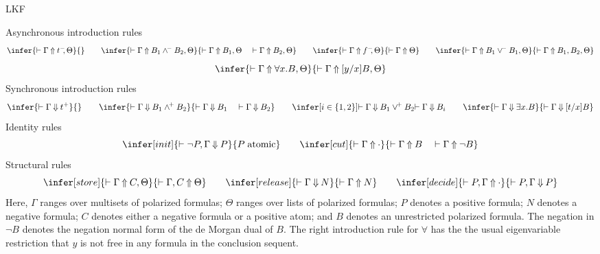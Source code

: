 \calculusAcronym{\LKF}




\maketitle

\begin{entry}{LKF}  

\newcommand{\true}{\hbox{\sl t}}
\newcommand{\false}{\hbox{\sl f}}
\newcommand{\truen}{t^-}
\newcommand{\truep}{t^+}
\newcommand{\falsen}{f^-}
\newcommand{\falsep}{f^+}
\newcommand{\wedgep}{\wedge^{\!+}}
\newcommand{\wedgen}{\wedge^{\!-}}
\newcommand{\veep}{\vee^{\!+}}
\newcommand{\veen}{\vee^{\!-}}

\newcommand{\async}[2]{\vdash#1\mathbin{\Uparrow}   #2}
\newcommand{\sync }[2]{\vdash#1\mathbin{\Downarrow} #2}

\begin{calculus}
{\sc Asynchronous introduction rules}
\[
\infer{\async{\Gamma}{\truen\kern-3pt,\Theta}}{}
\qquad
\infer{\async{\Gamma}{B_1\wedgen B_2,\Theta}}
      {\async{\Gamma}{B_1,\Theta}\quad \async{\Gamma}{B_2,\Theta}}
\qquad
\infer{\async{\Gamma}{\falsen\kern-3pt,\Theta}}{\async{\Gamma}{\Theta}}
\qquad
\infer{\async{\Gamma}{B_1\veen B_1,\Theta}}{\async{\Gamma}{B_1,B_2,\Theta}}
\]
\[
\infer{\async{\Gamma}{\forall x.B,\Theta}}{\async{\Gamma}{[y/x]B,\Theta}}
\]
{\sc Synchronous introduction rules}
\[
\infer{\sync{\Gamma}{\truep}}{}
\qquad
\infer{\sync{\Gamma}{B_1\wedgep B_2}}
      {\sync{\Gamma}{B_1}\quad\sync{\Gamma}{B_2}}
\qquad
\infer[i \in \{1,2\}]{\sync{\Gamma}{B_1\veep B_2}}{\sync{\Gamma}{B_i}}
\qquad
\infer{\sync{\Gamma}{\exists x.B}}{\sync{\Gamma}{[t/x]B}}
\]
{\sc Identity rules}
\[
\infer[init]{\sync{\neg P,\Gamma}{P}}{P \; \mbox{atomic}}
\qquad
\infer[cut]{\async{\Gamma}{\cdot}}{\async{\Gamma}{B}\quad \async{\Gamma}{\neg{B}}}
\]
{\sc Structural rules}
\[
\infer[store]{\async{\Gamma}{C,\Theta}}{\async{\Gamma,C}{\Theta}}
\qquad
\infer[release]{\sync{\Gamma}{N}}{\async{\Gamma}{N}}
\qquad
\infer[decide]{\async{P,\Gamma}{\cdot}}{\sync{P,\Gamma}{P}}
\]
Here,
$\Gamma$ ranges over multisets of polarized formulas;
$\Theta$ ranges over lists of polarized formulas;
$P$ denotes a positive formula;
$N$ denotes a negative formula;
$C$ denotes either a negative formula or a positive atom; and
$B$ denotes an unrestricted polarized formula.
The negation in $\neg B$ denotes the negation normal form of the de
Morgan dual of $B$.
The right introduction rule for $\forall$ has the the usual
eigenvariable restriction that $y$ is not free in any formula in the
conclusion sequent.
\end{calculus}


\end{entry}
